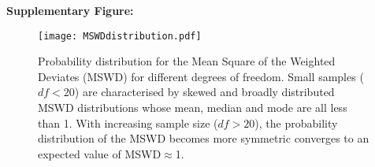 \documentclass{article}
\begin{document}
\textbf{Supplementary Figure:}\\

\begin{figure}
  \centering
  \texttt{[image: MSWDdistribution.pdf]}
  \caption{Probability distribution for the Mean Square of the
    Weighted Deviates (MSWD) for different degrees of freedom. Small
    samples ($df<20$) are characterised by skewed and broadly
    distributed MSWD distributions whose mean, median and mode are all
    less than 1. With increasing sample size ($df>20$), the
    probability distribution of the MSWD becomes more symmetric
    converges to an expected value of MSWD$\approx$1.  }
\end{figure}


%
%
\end{document}

